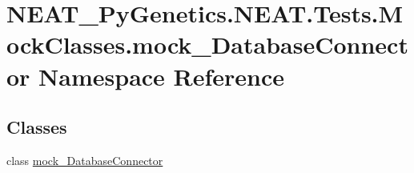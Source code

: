 \hypertarget{namespaceNEAT__PyGenetics_1_1NEAT_1_1Tests_1_1MockClasses_1_1mock__DatabaseConnector}{}\section{N\+E\+A\+T\+\_\+\+Py\+Genetics.\+N\+E\+A\+T.\+Tests.\+Mock\+Classes.\+mock\+\_\+\+Database\+Connector Namespace Reference}
\label{namespaceNEAT__PyGenetics_1_1NEAT_1_1Tests_1_1MockClasses_1_1mock__DatabaseConnector}
\subsection*{Classes}
\begin{DoxyCompactItemize}
\item 
class \hyperlink{classNEAT__PyGenetics_1_1NEAT_1_1Tests_1_1MockClasses_1_1mock__DatabaseConnector_1_1mock__DatabaseConnector}{mock\+\_\+\+Database\+Connector}
\end{DoxyCompactItemize}

